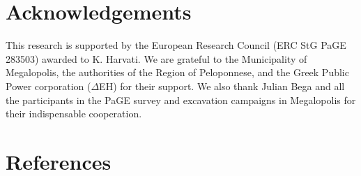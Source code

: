 \documentclass[review,authoryear,times]{elsarticle} %
\begin{document}
\section*{Acknowledgements}

This research is supported by the European Research Council (ERC StG PaGE 283503) awarded to K. Harvati. We are grateful to the Municipality of Megalopolis, the authorities of the Region of Peloponnese, and the Greek Public Power corporation ($\Delta$EH) for their support. We also thank Julian Bega and all the participants in the PaGE survey and excavation campaigns in Megalopolis for their indispensable cooperation. %
 
\section*{References}



\end{document}
